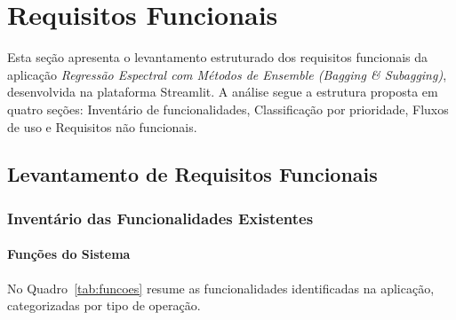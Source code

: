 \chapter{Requisitos Funcionais}
\label{sec:reqfunc}

Esta seção apresenta o levantamento estruturado dos requisitos funcionais da aplicação \textit{Regressão Espectral com Métodos de Ensemble (Bagging \& Subagging)}, desenvolvida na plataforma Streamlit. A análise segue a estrutura proposta em quatro seções: Inventário de funcionalidades, Classificação por prioridade, Fluxos de uso e Requisitos não funcionais.

\section{Levantamento de Requisitos Funcionais}
\label{sec:levantamento}

\subsection{Inventário das Funcionalidades Existentes}
\label{subsec:inventário}

\subsubsection{Funções do Sistema}
\label{ssubsec:funcoes}

No Quadro~\ref{tab:funcoes} resume as funcionalidades identificadas na aplicação, categorizadas por tipo de operação.


